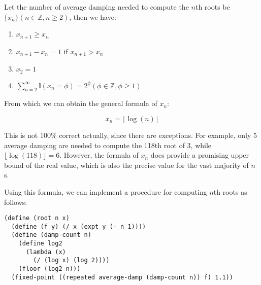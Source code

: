 \documentclass[../main.tex]{subfiles}
\begin{document}
Let the number of average damping needed to
 compute the $n$th roots be
 $\{x_n\}(n\in\mathbb{Z},n\geq2)$, then we have:

\begin{enumerate}
\item $x_{n+1}\geq x_n$
\item $x_{n+1}-x_n=1$ if $x_{n+1}>x_n$
\item $x_2 = 1$
\item $\sum_{n=2}^\infty\mathbb{I}(x_n=\phi)=2^\phi(\phi\in\mathbb{Z},\phi\geq1)$
\end{enumerate}

From which we can obtain the general formula of $x_n$:

$$
x_n = \lfloor\log(n)\rfloor
$$

This is not 100\% correct actually, since there are
 exceptions. For example, only 5 average damping are
 needed to compute the 118th root of 3, while
 $\lfloor\log(118)\rfloor=6$. However, the formula
 of $x_n$ does provide a promising upper bound of
 the real value, which is also the precise value for
 the vast majority of $n$s.

Using this formula, we can implement a procedure for computing
 $n$th roots as follows:

\begin{lstlisting}
(define (root n x)
  (define (f y) (/ x (expt y (- n 1))))
  (define (damp-count n)
    (define log2
      (lambda (x)
        (/ (log x) (log 2))))
    (floor (log2 n)))
  (fixed-point ((repeated average-damp (damp-count n)) f) 1.1))
\end{lstlisting}
\end{document}
